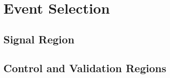 
\chapter{Event Selection} %

\label{ch:eventsel} 


\section{Signal Region}
\label{sec:sr}
\section{Control and Validation Regions}


